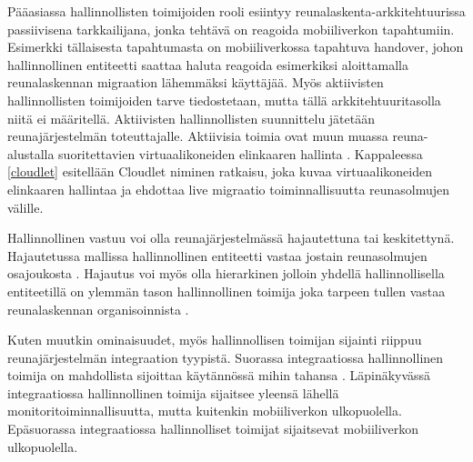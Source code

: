 Pääasiassa hallinnollisten toimijoiden rooli esiintyy reunalaskenta\hyp arkkitehtuurissa passiivisena tarkkailijana, jonka tehtävä on reagoida mobiiliverkon tapahtumiin. 
Esimerkki tällaisesta tapahtumasta on mobiiliverkossa tapahtuva handover, johon hallinnollinen entiteetti saattaa haluta reagoida esimerkiksi aloittamalla reunalaskennan migraation lähemmäksi käyttäjää. 
Myös aktiivisten hallinnollisten toimijoiden tarve tiedostetaan, mutta tällä arkkitehtuuritasolla niitä ei määritellä.
Aktiivisten hallinnollisten suunnittelu jätetään reunajärjestelmän toteuttajalle.
Aktiivisia toimia ovat muun muassa reuna-alustalla suoritettavien virtuaalikoneiden elinkaaren hallinta \cite{yousaf16fine}. Kappaleessa \ref{cloudlet} esitellään Cloudlet niminen ratkaisu, joka kuvaa virtuaalikoneiden elinkaaren hallintaa ja ehdottaa live migraatio toiminnallisuutta reunasolmujen välille.


Hallinnollinen vastuu voi olla reunajärjestelmässä hajautettuna tai keskitettynä.
Hajautetussa mallissa hallinnollinen entiteetti vastaa jostain reunasolmujen osajoukosta \cite{lobillo15scc}. Hajautus voi myös olla hierarkinen jolloin yhdellä hallinnollisella entiteetillä on ylemmän tason hallinnollinen toimija joka tarpeen tullen vastaa reunalaskennan organisoinnista \cite{mach17mobile}.

Kuten muutkin ominaisuudet, myös hallinnollisen toimijan sijainti riippuu reunajärjestelmän integraation tyypistä. 
Suorassa integraatiossa hallinnollinen toimija on mahdollista sijoittaa käytännössä mihin tahansa \cite{mach17mobile}.
Läpinäkyvässä integraatiossa hallinnollinen toimija sijaitsee yleensä lähellä monitoritoiminnallisuutta, mutta kuitenkin mobiiliverkon ulkopuolella. 
Epäsuorassa integraatiossa hallinnolliset toimijat sijaitsevat mobiiliverkon ulkopuolella.

